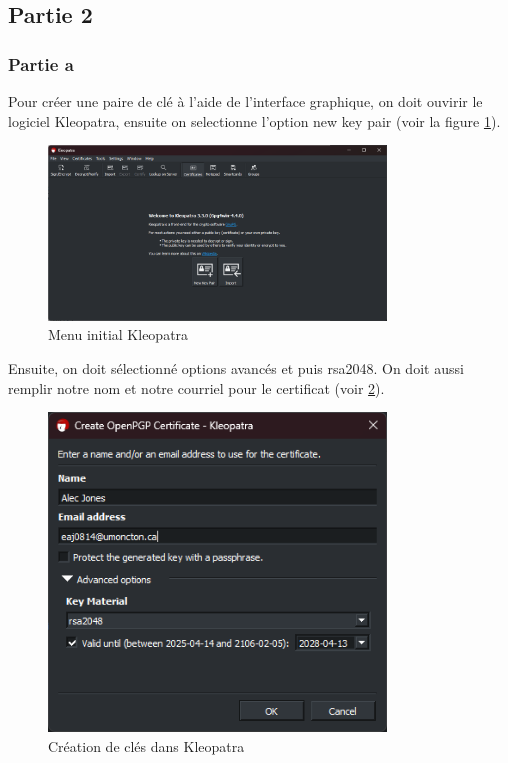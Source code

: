 \documentclass[12pt,a4paper]{article}
\begin{document}
\subsection{Partie 2}
\subsubsection{Partie a}
Pour créer une paire de clé à l'aide de l'interface graphique, on doit ouvirir le logiciel
Kleopatra, ensuite on selectionne l'option new key pair (voir la figure \ref{kleopatra}).

\begin{figure}[h]
    \centering
    \includegraphics[width=0.8\textwidth]{../img/kleopatra.png}
    \caption{Menu initial Kleopatra}
    \label{kleopatra}
\end{figure}

Ensuite, on doit sélectionné options avancés et puis rsa2048.
On doit aussi remplir notre nom et notre courriel pour le certificat (voir \ref{newKey}).

\begin{figure}[ht]
    \centering
    \includegraphics[width=0.8\textwidth]{../img/newKey.png}
    \caption{Création de clés dans Kleopatra}
    \label{newKey}
\end{figure}
\end{document}
